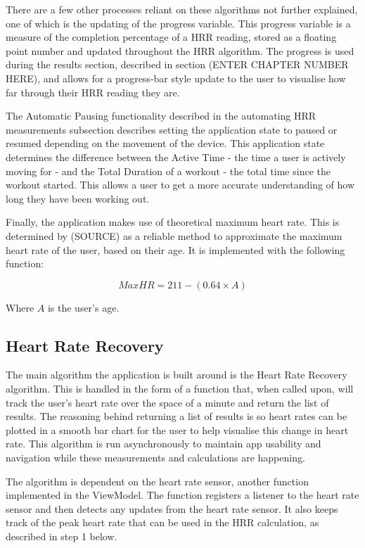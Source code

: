 \documentclass{l4proj}
\begin{document}
There are a few other processes reliant on these algorithms not further explained, one of which is the updating of the progress variable. This progress variable is a measure of the completion percentage of a HRR reading, stored as a floating point number and updated throughout the HRR algorithm. The progress is used during the results section, described in section (ENTER CHAPTER NUMBER HERE), and allows for a progress-bar style update to the user to visualise how far through their HRR reading they are.

The Automatic Pausing functionality described in the automating HRR measurements subsection describes setting the application state to paused or resumed depending on the movement of the device. This application state determines the difference between the Active Time - the time a user is actively moving for - and the Total Duration of a workout - the total time since the workout started. This allows a user to get a more accurate understanding of how long they have been working out.

Finally, the application makes use of theoretical maximum heart rate. This is determined by (SOURCE) as a reliable method to approximate the maximum heart rate of the user, based on their age. It is implemented with the following function:

$$
MaxHR = 211 - (0.64 \times A)
$$

Where $A$ is the user’s age.

\subsection{Heart Rate Recovery}
\label{sec:hrrimplementation}

The main algorithm the application is built around is the Heart Rate Recovery algorithm. This is handled in the form of a function that, when called upon, will track the user’s heart rate over the space of a minute and return the list of results. The reasoning behind returning a list of results is so heart rates can be plotted in a smooth bar chart for the user to help visualise this change in heart rate. This algorithm is run asynchronously to maintain app usability and navigation while these measurements and calculations are happening. 

The algorithm is dependent on the heart rate sensor, another function implemented in the ViewModel. The function registers a listener to the heart rate sensor and then detects any updates from the heart rate sensor. It also keeps track of the peak heart rate that can be used in the HRR calculation, as described in step 1 below. 
\end{document}
